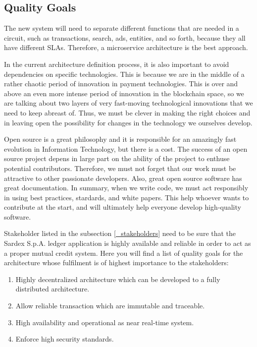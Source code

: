 \subsection{Quality Goals}\label{_quality_goals}
The new system will need to separate different functions that are needed in a circuit, such as transactions, search, ads, entities, and so forth, because they all have different SLAs. Therefore, a microservice architecture is the best approach.

In the current architecture definition process, it is also important to avoid dependencies on specific technologies. This is because we are in the middle of a rather chaotic period of innovation in payment technologies. This is over and above an even more intense period of innovation in the blockchain space, so we are talking about two layers of very fast-moving technological innovations that we need to keep abreast of. Thus, we must be clever in making the right choices and in leaving open the possibility for changes in the technology we ourselves develop.

Open source is a great philosophy and it is responsible for an amazingly fast evolution in Information Technology, but there is a cost. The success of an open source project depens in large part on the ability of the project to enthuse potential contributors. Therefore, we must not forget that our work must be attractive to other passionate developers. Also, great open source software has great documentation. In summary, when we write code, we must act responsibly in using best practices, stardards, and white papers. This help whoever wants to contribute at the start, and will ultimately help everyone develop high-quality software.

Stakeholder listed in the subsection \ref{_stakeholders} need to be sure that the Sardex S.p.A. ledger application is highly available and reliable in order to act as a proper mutual credit system. Here you will find a list of quality goals for the architecture whose fulfilment is of highest importance to the stakeholders:

\begin{enumerate}
	\item Highly decentralized architecture which can be developed to a fully distributed architecture.
	\item Allow reliable transaction which are immutable and traceable.
	\item High availability and operational as near real-time system.
	\item Enforce high security standards.
\end{enumerate} 

